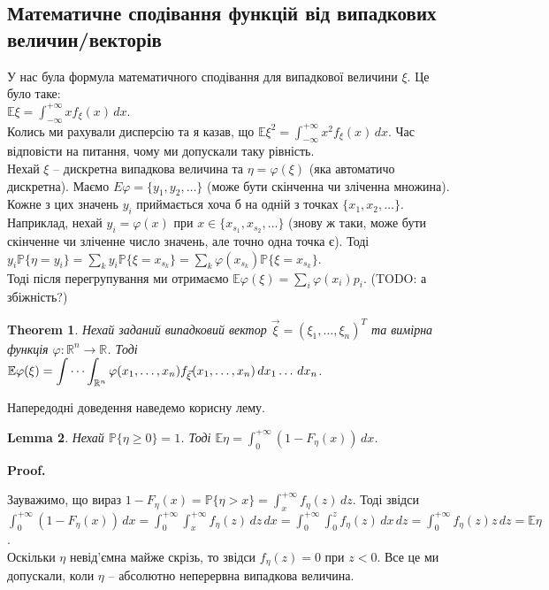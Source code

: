 \documentclass[a4paper, 10pt]{article}
\makeatletter
\theoremstyle{theoremdd}
\newtheorem{theorem}{Theorem}[subsection]
\newtheorem{lemma}[theorem]{Lemma}
\renewenvironment{proof}[1][Proof.\\]{\par
\pushQED{\hfill \qed}%
\normalfont \topsep6\p@\@plus6\p@\relax
\trivlist
\item\relax
{\bfseries
#1\@addpunct{.}}\hspace\labelsep\ignorespaces
}{%
\popQED\endtrivlist\@endpefalse
}
\makeatother
\begin{document}
\subsection{Математичне сподівання функцій від випадкових величин/векторів}
У нас була формула математичного сподівання для випадкової величини $\xi$. Це було таке:\\
$\mathbb{E}\xi = \displaystyle\int_{-\infty}^{+\infty} x f_\xi(x)\,dx$.\\
Колись ми рахували дисперсію та я казав, що $\mathbb{E}\xi^2 = \displaystyle\int_{-\infty}^{+\infty} x^2 f_\xi(x)\,dx$. Час відповісти на питання, чому ми допускали таку рівність.
\bigskip \\
Нехай $\xi$ -- дискретна випадкова величина та $\eta = \varphi(\xi)$ (яка автоматичо дискретна). Маємо $E\varphi = \{y_1,y_2,\dots\}$ (може бути скінченна чи зліченна множина). Кожне з цих значень $y_i$ приймається хоча б на одній з точках $\{x_1,x_2,\dots\}$. Наприклад, нехай $y_i = \varphi(x)$ при $x \in \{x_{s_1},x_{s_2},\dots\}$ (знову ж таки, може бути скінченне чи зліченне число значень, але точно одна точка є). Тоді\\
$y_i \mathbb{P}\{\eta = y_i\} = \displaystyle\sum_k y_i \mathbb{P}\{\xi = x_{s_k}\} = \sum_k \varphi(x_{s_k}) \mathbb{P}\{\xi = x_{s_k}\}$.\\
Тоді після перегрупування ми отримаємо $\mathbb{E}\varphi(\xi) = \displaystyle\sum_i \varphi(x_i) p_i$. (TODO: а збіжність?)

\begin{theorem}
Нехай заданий випадковий вектор $\vec{\xi} = (\xi_1,\dots,\xi_n)^T$ та вимірна функція $\varphi \colon \mathbb{R}^n \to \mathbb{R}$. Тоді $\mathbb{E} \varphi(\xi) = \displaystyle\idotsint_{\mathbb{R}^n} \varphi(x_1,\dots,x_n) f_{\vec{\xi}}(x_1,\dots,x_n)\,dx_1 \dots \,dx_n$.
\end{theorem}
\noindent
Напередодні доведення наведемо корисну лему.

\begin{lemma}
\label{expectation_of_nonnegative_random_value}
Нехай $\mathbb{P}\{\eta \geq 0 \} = 1$. Тоді $\mathbb{E}\eta = \displaystyle\int_0^{+\infty} (1-F_\eta(x))\,dx$.
\end{lemma}

\begin{proof}
Зауважимо, що вираз $1 - F_\eta(x) = \mathbb{P}\{\eta > x\} = \displaystyle\int_x^{+\infty} f_\eta(z)\,dz$. Тоді звідси\\
$\displaystyle\int_0^{+\infty} (1-F_\eta(x))\,dx = \int_0^{+\infty} \int_x^{+\infty} f_\eta(z)\,dz\,dx = \int_0^{+\infty} \int_0^z f_\eta(z)\,dx\,dz = \int_0^{+\infty} f_\eta(z) z\,dz = \mathbb{E}\eta$.\\
Оскільки $\eta$ невід'ємна майже скрізь, то звідси $f_\eta(z) = 0$ при $z < 0$. Все це ми допускали, коли $\eta$ -- абсолютно неперервна випадкова величина.
\end{proof}
\end{document}
